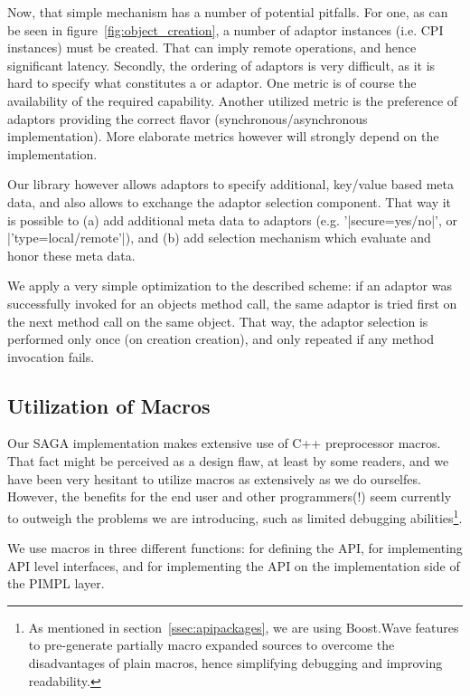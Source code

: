 Now, that simple mechanism has a number of potential pitfalls.  For
one, as can be seen in figure~\ref{fig:object_creation}, a number of
adaptor instances (i.e. CPI instances) must be created.  That can
imply remote operations, and hence significant latency.  Secondly, the
ordering of adaptors is very difficult, as it is hard to specify what
constitutes a  or  adaptor.  One metric is of
course the availability of the required capability.  Another utilized
metric is the preference of adaptors providing the correct flavor
(synchronous/asynchronous implementation).  More elaborate metrics
however will strongly depend on the implementation.

Our library however allows adaptors to specify additional, key/value
based meta data, and also allows to exchange the adaptor selection
component.  That way it is possible to (a) add additional meta data to
adaptors (e.g. '|secure=yes/no|', or |'type=local/remote'|), and (b)
add selection mechanism which evaluate and honor these meta data.

We apply a very simple optimization to the described scheme: if an
adaptor was successfully invoked for an objects method call, the same
adaptor is tried first on the next method call on the same object.
That way, the adaptor selection is performed only once (on creation
creation), and only repeated if any method invocation fails.


\subsection{Utilization of Macros}
\label{ssec:macros}

Our SAGA implementation makes extensive use of C++ preprocessor
macros.  That fact might be perceived as a design flaw, at least by
some readers, and we have been very hesitant to utilize macros as
extensively as we do ourselfes.  However, the benefits for the end user
and other programmers(!) seem currently to outweigh the problems we are
introducing, such as limited debugging abilities\footnote{\small As
mentioned in section~\ref{ssec:apipackages}, we are using Boost.Wave
features to pre-generate partially macro expanded sources to overcome 
the disadvantages of plain macros, hence simplifying debugging and 
improving readability.}.

We use macros in three different functions: for defining the API, for
implementing API level interfaces, and for implementing the API on the
implementation side of the PIMPL layer.

